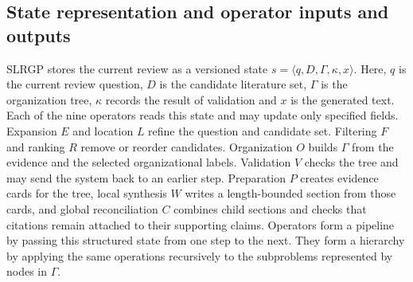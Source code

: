 \documentclass[11pt,a4paper]{article}
\begin{document}
\subsection*{State representation and operator inputs and outputs}

SLRGP stores the current review as a versioned state $s=\langle q,D,\Gamma,\kappa,x\rangle$. Here, $q$ is the current review question, $D$ is the candidate literature set, $\Gamma$ is the organization tree, $\kappa$ records the result of validation and $x$ is the generated text. Each of the nine operators reads this state and may update only specified fields. Expansion $E$ and location $L$ refine the question and candidate set. Filtering $F$ and ranking $R$ remove or reorder candidates. Organization $O$ builds $\Gamma$ from the evidence and the selected organizational labels. Validation $V$ checks the tree and may send the system back to an earlier step. Preparation $P$ creates evidence cards for the tree, local synthesis $W$ writes a length-bounded section from those cards, and global reconciliation $C$ combines child sections and checks that citations remain attached to their supporting claims. Operators form a pipeline by passing this structured state from one step to the next. They form a hierarchy by applying the same operations recursively to the subproblems represented by nodes in $\Gamma$.
\end{document}
